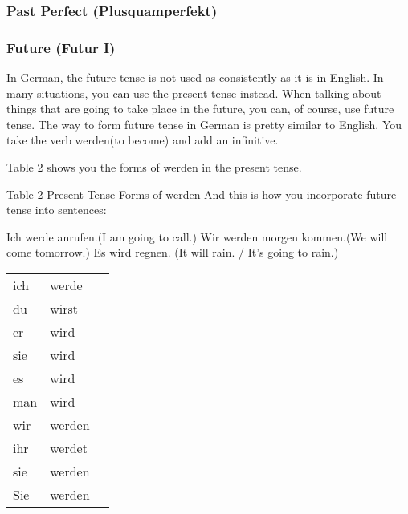 \documentclass[a4paper,twocolumn,10pt]{article}
\newcommand{\subsubsectionend}
{
\nolinenumbers
\linenumbers
}
\newcommand{\tabularxtable}[3]
{

	\vspace{0.5cm}
	\nolinenumbers

	\begin{tabularx}{#1}{#2}
		#3
	\end{tabularx}

	\linenumbers
	\vspace{0.5cm}
}
\begin{document}



\subsubsectionend

\subsubsection{Past Perfect (Plusquamperfekt)}
\label{sssec:past_perfect}



\subsubsectionend

\subsubsection{Future (Futur I)}
\label{sssec:future_i}

In German, the future tense is not used as consistently as it is in English. In
many situations, you can use the present tense instead. When talking about
things that are going to take place in the future, you can, of course, use
future tense. The way to form future tense in German is pretty similar to
English. You take the verb werden(to become) and add an infinitive.

Table 2 shows you the forms of werden in the present tense.

Table 2 Present Tense Forms of werden And this is how you incorporate future
tense into sentences:

    Ich werde anrufen.(I am going to call.)
	Wir werden morgen kommen.(We will come tomorrow.)
	Es wird regnen.    (It will rain. / It’s going to rain.)



\tabularxtable
{0.95\linewidth}
{llX}
{

ich & werde  & \\
du  & wirst  & \\
er  & wird   & \\
sie & wird   & \\
es  & wird   & \\
man & wird   & \\
wir & werden & \\
ihr & werdet & \\
sie & werden & \\
Sie & werden & \\
}
\end{document}
